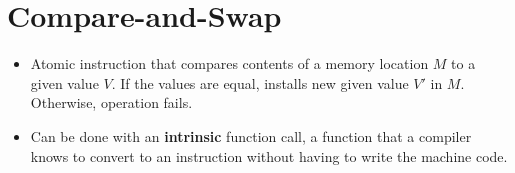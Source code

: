 \documentclass[11pt]{article}
\begin{document}
\maketitle
\thispagestyle{plain}

\section{Compare-and-Swap}
\begin{itemize}
    \item
    Atomic instruction that compares contents of a memory location $M$ to a given value $V$.
    If the values are equal, installs new given value $V'$ in $M$. Otherwise, operation fails.
    
    \item
    Can be done with an \textbf{intrinsic} function call, a function that a compiler knows to 
    convert to an instruction without having to write the machine code.
\end{itemize}

\end{document}
